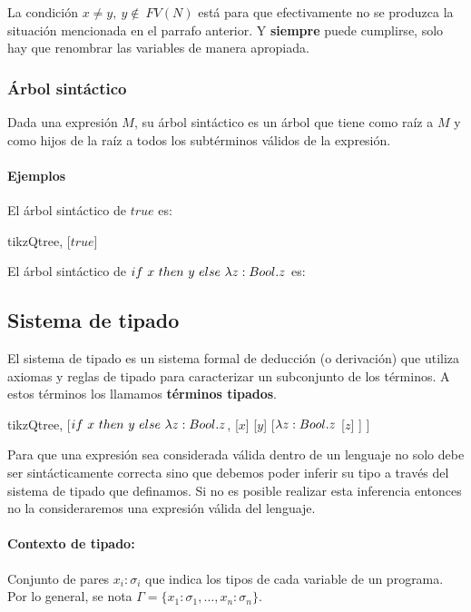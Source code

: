 La condición $x\neq y,~y\notin~FV(N)$ está para que efectivamente no se produzca la situación mencionada en el parrafo anterior. Y \textbf{siempre} puede cumplirse, solo hay que renombrar las variables de manera apropiada.

\subsubsection{Árbol sintáctico}
Dada una expresión $M$, su árbol sintáctico es un árbol que tiene como raíz a $M$ y como hijos de la raíz a todos los subtérminos válidos de la expresión.
\paragraph{Ejemplos}
El árbol sintáctico de $true$ es:
\begin{center}
	\begin{forest} tikzQtree,
		[$true$]
	\end{forest}
\end{center}

El árbol sintáctico de $if~ x~ then~ y~ else~ \lambda z: Bool . z$ es:



\subsection{Sistema de tipado}
El sistema de tipado es un sistema formal de deducción (o derivación) que utiliza axiomas y reglas de tipado para caracterizar un subconjunto de los términos. A estos términos los llamamos \textbf{términos tipados}.
\begin{center}
	\begin{forest} tikzQtree,
		[$if~ x~ then~ y~ else~ \lambda z: Bool . z$, 
			[$x$]
			[$y$]
			[$\lambda z: Bool . z$
				[$z$]
			]
		]
	\end{forest}
\end{center}
Para que una expresión sea considerada válida dentro de un lenguaje no solo debe ser sintácticamente correcta sino que debemos poder inferir su tipo a través del sistema de tipado que definamos. Si no es posible realizar esta inferencia entonces no la consideraremos una expresión válida del lenguaje.

\paragraph{Contexto de tipado:} Conjunto de pares $x_i:\sigma_i$ que indica los tipos de cada variable de un programa. Por lo general, se nota  $\Gamma = \{x_1:\sigma_1, \dots, x_n:\sigma_n\}$.

